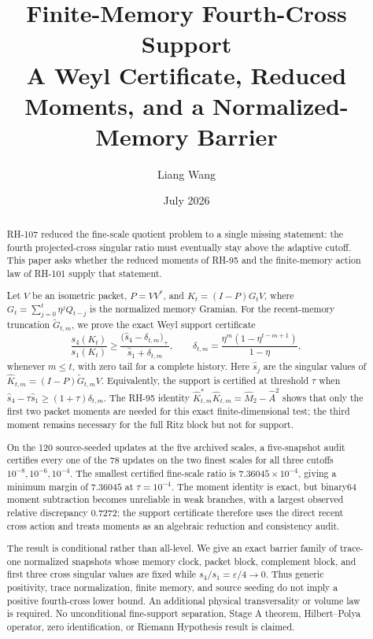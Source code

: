 \documentclass[11pt]{article}
\title{Finite-Memory Fourth-Cross Support\\
\large A Weyl Certificate, Reduced Moments, and a Normalized-Memory Barrier}
\author{Liang Wang}
\date{July 2026}
\theoremstyle{definition}
\theoremstyle{remark}
\begin{document}
\maketitle

\begin{abstract}
RH-107 reduced the fine-scale quotient problem to a single missing statement:
the fourth projected-cross singular ratio must eventually stay above the
adaptive cutoff.  This paper asks whether the reduced moments of RH-95 and
the finite-memory action law of RH-101 supply that statement.

Let $V$ be an isometric packet, $P=VV^*$, and
$K_t=(I-P)G_tV$, where
$G_t=\sum_{j=0}^{t}\eta^jQ_{t-j}$ is the normalized memory Gramian.  For
the recent-memory truncation $\widetilde G_{t,m}$, we prove the exact
Weyl support certificate
\begin{equation}
 \frac{s_4(K_t)}{s_1(K_t)}
 \ge
 \frac{\bigl(\widehat s_4-\delta_{t,m}\bigr)_+}
      {\widehat s_1+\delta_{t,m}},
 \qquad
 \delta_{t,m}=\frac{\eta^m(1-\eta^{t-m+1})}{1-\eta},
 \label{eq:abstract-certificate}
\end{equation}
whenever $m\le t$, with zero tail for a complete history.  Here
$\widehat s_j$ are the singular values of
$\widehat K_{t,m}=(I-P)\widetilde G_{t,m}V$.  Equivalently, the support is
certified at threshold $\tau$ when
$\widehat s_4-\tau\widehat s_1\ge(1+\tau)\delta_{t,m}$.
The RH-95 identity
$\widehat K_{t,m}^*\widehat K_{t,m}=\widehat M_2-\widehat A^2$
shows that only the first two packet moments are needed for this exact
finite-dimensional test; the third moment remains necessary for the full
Ritz block but not for support.

On the 120 source-seeded updates at the five archived scales, a five-snapshot
audit certifies every one of the 78 updates on the two finest scales for all
three cutoffs $10^{-8},10^{-6},10^{-4}$.  The smallest certified fine-scale
ratio is $7.36045\times10^{-4}$, giving a minimum margin of $7.36045$ at
$\tau=10^{-4}$.  The moment identity is exact, but binary64 moment
subtraction becomes unreliable in weak branches, with a largest observed
relative discrepancy $0.7272$; the support certificate therefore uses the
direct recent cross action and treats moments as an algebraic reduction and
consistency audit.

The result is conditional rather than all-level.  We give an exact barrier
family of trace-one normalized snapshots whose memory clock, packet block,
complement block, and first three cross singular values are fixed while
$s_4/s_1=\varepsilon/4\to0$.  Thus generic positivity, trace normalization,
finite memory, and source seeding do not imply a positive fourth-cross lower
bound.  An additional physical transversality or volume law is required.
No unconditional fine-support separation, Stage A theorem, Hilbert--Polya
operator, zero identification, or Riemann Hypothesis result is claimed.
\end{abstract}
\end{document}
